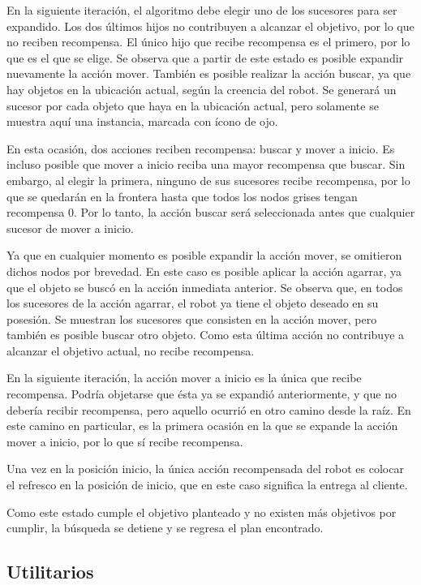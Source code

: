 \documentclass[11pt]{article}
\begin{document}
En la siguiente iteración, el algoritmo debe elegir uno de los sucesores para ser expandido. Los dos últimos hijos no contribuyen a alcanzar el objetivo, por lo que no reciben recompensa. El único hijo que recibe recompensa es el primero, por lo que es el que se elige. Se observa que a partir de este estado es posible expandir nuevamente la acción mover. También es posible realizar la acción buscar, ya que hay objetos en la ubicación actual, según la creencia del robot. Se generará un sucesor por cada objeto que haya en la ubicación actual, pero solamente se muestra aquí una instancia, marcada con ícono de ojo.

En esta ocasión, dos acciones reciben recompensa: buscar y mover a inicio. Es incluso posible que mover a inicio reciba una mayor recompensa que buscar. Sin embargo, al elegir la primera, ninguno de sus sucesores recibe recompensa, por lo que se quedarán en la frontera hasta que todos los nodos grises tengan recompensa 0. Por lo tanto, la acción buscar será seleccionada antes que cualquier sucesor de mover a inicio.

Ya que en cualquier momento es posible expandir la acción mover, se omitieron dichos nodos por brevedad. En este caso es posible aplicar la acción agarrar, ya que el objeto se buscó en la acción inmediata anterior. Se observa que, en todos los sucesores de la acción agarrar, el robot ya tiene el objeto deseado en su posesión. Se muestran los sucesores que consisten en la acción mover, pero también es posible buscar otro objeto. Como esta última acción no contribuye a alcanzar el objetivo actual, no recibe recompensa.

En la siguiente iteración, la acción mover a inicio es la única que recibe recompensa. Podría objetarse que ésta ya se expandió anteriormente, y que no debería recibir recompensa, pero aquello ocurrió en otro camino desde la raíz. En este camino en particular, es la primera ocasión en la que se expande la acción mover a inicio, por lo que sí recibe recompensa.

Una vez en la posición inicio, la única acción recompensada del robot es colocar el refresco en la posición de inicio, que en este caso significa la entrega al cliente.

Como este estado cumple el objetivo planteado y no existen más objetivos por cumplir, la búsqueda se detiene y se regresa el plan encontrado.

\subsection{Utilitarios}
\end{document}
